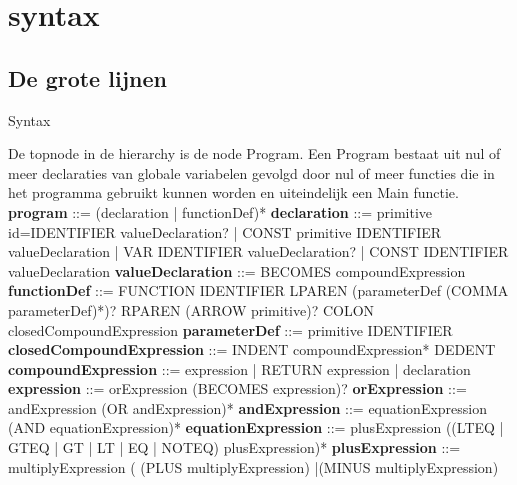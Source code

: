 \chapter{syntax}
\section{De grote lijnen}
Syntax

De topnode in de hierarchy is de node Program. Een Program bestaat uit nul of meer declaraties van globale variabelen gevolgd door nul of meer functies die in het programma gebruikt kunnen worden en uiteindelijk een Main functie.
\newline 
{\bf program}                     ::= (declaration | functionDef)*
\newline 
{\bf declaration}                 ::= primitive id=IDENTIFIER valueDeclaration?
                                    | CONST primitive IDENTIFIER valueDeclaration
                                    | VAR IDENTIFIER valueDeclaration?
                                    | CONST IDENTIFIER valueDeclaration
\newline   
{\bf valueDeclaration}            ::= BECOMES compoundExpression
\newline  
{\bf functionDef}                 ::= FUNCTION IDENTIFIER LPAREN (parameterDef (COMMA parameterDef)*)? RPAREN (ARROW primitive)? COLON closedCompoundExpression
\newline   
{\bf parameterDef}                ::= primitive IDENTIFIER 
\newline 
{\bf closedCompoundExpression}    ::= INDENT compoundExpression* DEDENT
\newline 
{\bf compoundExpression}          ::= expression
                                    | RETURN expression
                                    | declaration
\newline 
{\bf expression}                  ::= orExpression (BECOMES expression)?
\newline   
{\bf orExpression}                ::= andExpression (OR andExpression)*
\newline   
{\bf andExpression}               ::= equationExpression (AND equationExpression)*
\newline 
{\bf equationExpression}          ::= plusExpression ((LTEQ | GTEQ | GT | LT | EQ | NOTEQ) plusExpression)*
\newline 
{\bf plusExpression}              ::= multiplyExpression (       (PLUS multiplyExpression)
                                                           |(MINUS multiplyExpression)
